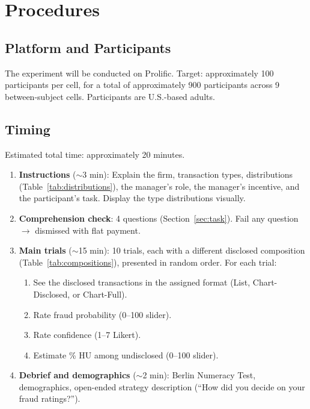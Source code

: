 \documentclass[12pt]{article}
\theoremstyle{definition}
\begin{document}
\section{Procedures}
\label{sec:procedures}

\subsection{Platform and Participants}

The experiment will be conducted on Prolific. Target: approximately 100 participants per cell, for a total of approximately 900 participants across 9 between-subject cells. Participants are U.S.-based adults.

\subsection{Timing}

Estimated total time: approximately 20 minutes.

\begin{enumerate}[nosep]
\item \textbf{Instructions} ($\sim$3 min): Explain the firm, transaction types, distributions (Table~\ref{tab:distributions}), the manager's role, the manager's incentive, and the participant's task. Display the type distributions visually.

\item \textbf{Comprehension check}: 4 questions (Section~\ref{sec:task}). Fail any question $\to$ dismissed with flat payment.

\item \textbf{Main trials} ($\sim$15 min): 10 trials, each with a different disclosed composition (Table~\ref{tab:compositions}), presented in random order. For each trial:
\begin{enumerate}[nosep]
\item See the disclosed transactions in the assigned format (List, Chart-Disclosed, or Chart-Full).
\item Rate fraud probability (0--100 slider).
\item Rate confidence (1--7 Likert).
\item Estimate \% HU among undisclosed (0--100 slider).
\end{enumerate}

\item \textbf{Debrief and demographics} ($\sim$2 min): Berlin Numeracy Test, demographics, open-ended strategy description (``How did you decide on your fraud ratings?'').
\end{enumerate}
\end{document}
